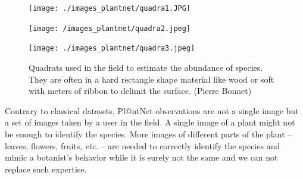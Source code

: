 \begin{figure}[bth]
        \centering
        \begin{minipage}[b]{0.3\textwidth}
            \centering
            \texttt{[image: ./images\_plantnet/quadra1.JPG]}
        \end{minipage}
        \hfill
        \begin{minipage}[b]{0.3\textwidth}
            \centering
            \texttt{[image: /images\_plantnet/quadra2.jpeg]}
        \end{minipage}
        \hfill
        \begin{minipage}[b]{0.3\textwidth}
            \centering
            \texttt{[image: ./images\_plantnet/quadra3.jpeg]}
        \end{minipage}
        \caption{Quadrats used in the field to estimate the abundance of species. They are often in a hard rectangle shape material like wood or soft with meters of ribbon to delimit the surface. (\textcopyright Pierre Bonnet)}
        \label{fig:quadrats}
    \end{figure}

Contrary to classical datasets, Pl@ntNet observations are not a single image but a set of images taken by a user in the field.
A single image of a plant might not be enough to identify the species.
More images of different parts of the plant -- leaves, flowers, fruits, \emph{etc.} -- are needed to correctly identify the species and mimic a botanist's behavior while it is surely not the same and we can not replace such expertise.

